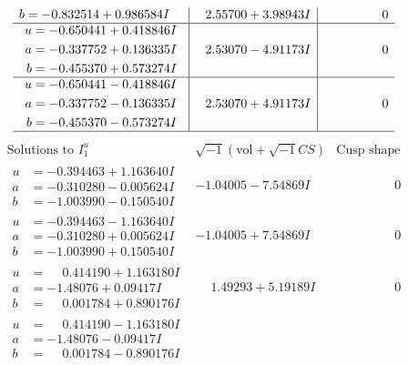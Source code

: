 \documentclass[1p]{elsarticle_modified}
\theoremstyle{definition}
\newcommand{\I}{\sqrt{-1}}
\begin{document}
$$\begin{array}{c|c|c}
\begin{aligned}
b &= -0.832514 + 0.986584 I\end{aligned}
 & \phantom{-}2.55700 + 3.98943 I & \phantom{-0.000000 } 0 \\ \hline\begin{aligned}
u &= -0.650441 + 0.418846 I \\
a &= -0.337752 + 0.136335 I \\
b &= -0.455370 + 0.573274 I\end{aligned}
 & \phantom{-}2.53070 - 4.91173 I & \phantom{-0.000000 } 0 \\ \hline\begin{aligned}
u &= -0.650441 - 0.418846 I \\
a &= -0.337752 - 0.136335 I \\
b &= -0.455370 - 0.573274 I\end{aligned}
 & \phantom{-}2.53070 + 4.91173 I & \phantom{-0.000000 } 0\\
 \hline 
 \end{array}$$\newpage$$\begin{array}{c|c|c}  
\text{Solutions to }I^u_{1}& \I (\text{vol} + \sqrt{-1}CS) & \text{Cusp shape}\\
 \hline 
\begin{aligned}
u &= -0.394463 + 1.163640 I \\
a &= -0.310280 - 0.005624 I \\
b &= -1.003990 - 0.150540 I\end{aligned}
 & -1.04005 - 7.54869 I & \phantom{-0.000000 } 0 \\ \hline\begin{aligned}
u &= -0.394463 - 1.163640 I \\
a &= -0.310280 + 0.005624 I \\
b &= -1.003990 + 0.150540 I\end{aligned}
 & -1.04005 + 7.54869 I & \phantom{-0.000000 } 0 \\ \hline\begin{aligned}
u &= \phantom{-}0.414190 + 1.163180 I \\
a &= -1.48076 + 0.09417 I \\
b &= \phantom{-}0.001784 + 0.890176 I\end{aligned}
 & \phantom{-}1.49293 + 5.19189 I & \phantom{-0.000000 } 0 \\ \hline\begin{aligned}
u &= \phantom{-}0.414190 - 1.163180 I \\
a &= -1.48076 - 0.09417 I \\
b &= \phantom{-}0.001784 - 0.890176 I\end{aligned}

\end{array}$$
\end{document}
